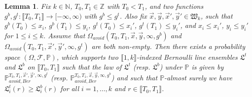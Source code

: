 \documentclass[12pt]{article}
\newtheorem*{lemma*}{Lemma}
\begin{document}
	\begin{lemma*}
		Fix $k \in \mathbb{N}$, $T_0, T_1 \in \mathbb{Z}$ with $T_0 < T_1$, and two functions $g^b, g^t: \llbracket T_0, T_1 \rrbracket  \rightarrow [-\infty, \infty)$ with $g^b\leq g^t$. Also fix $\vec{x}, \vec{y}, \vec{x}', \vec{y}' \in \mathfrak{W}_k$, such that $g^b(T_0)\leq x_i$, $g^b(T_1)\leq y_i$, $g^t(T_0)\leq x_i'$, $g^t(T_1)\leq y_i'$, and $x_i\leq x_i'$, $y_i\leq y_i'$ for $1\leq i\leq k$. Assume that $\Omega_{avoid}(T_0, T_1, \vec{x}, \vec{y}, \infty,g^b)$ and $\Omega_{avoid}(T_0, T_1, \vec{x}', \vec{y}', \infty,g^t)$ are both non-empty. Then there exists a probability space $(\Omega, \mathcal{F}, \mathbb{P})$, which supports two $\llbracket 1, k \rrbracket$-indexed Bernoulli line ensembles $\mathfrak{L}^t$ and $\mathfrak{L}^b$ on $\llbracket T_0, T_1 \rrbracket$ such that the law of $\mathfrak{L}^{t}$ {\big (}resp. $\mathfrak{L}^b${\big )} under $\mathbb{P}$ is given by $\mathbb{P}_{avoid, Ber}^{T_0, T_1, \vec{x}', \vec{y}', \infty, g^t}$ {\big (}resp. $\mathbb{P}_{avoid, Ber}^{T_0, T_1, \vec{x}, \vec{y}, \infty, g^b}${\big )} and such that $\mathbb{P}$-almost surely we have $\mathfrak{L}_i^t(r) \geq \mathfrak{L}^b_i(r)$ for all $i = 1,\dots, k$ and $r \in \llbracket T_0, T_1 \rrbracket$.
	\end{lemma*}
\end{document}
